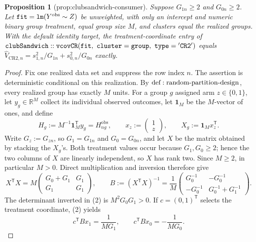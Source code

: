 \documentclass{article}
\newtheorem{proposition}{Proposition}
\begin{document}
\begin{proposition}[prop:clubsandwich-consumer]\label{prop:clubsandwich-consumer}
Suppose \(G_{1n}\ge 2\) and \(G_{0n}\ge 2\). Let \({\tt fit}={\tt lm}(Y^{\mathrm{obs}}\sim Z)\) be unweighted, with only an intercept and numeric binary group treatment, equal group size \(M\), and clusters equal the realized groups. With the default identity target, the treatment-coordinate entry of \({\tt clubSandwich::vcovCR}({\tt fit},\ {\tt cluster}={\tt group},\ {\tt type}={\tt 'CR2'})\) equals \(\widehat V_{\mathrm{CR2},n}=s_{1,n}^2/G_{1n}+s_{0,n}^2/G_{0n}\) exactly.
\end{proposition}
\begin{proof}
Fix one realized data set and suppress the row index \(n\).  The assertion is deterministic conditional on this realization.  By \({\rm def:random\text{-}partition\text{-}design}\), every realized group has exactly \(M\) units.  For a group \(g\) assigned arm \(z\in\{0,1\}\), let \(y_g\in\mathbb R^M\) collect its individual observed outcomes, let \(\mathbf 1_M\) be the \(M\)-vector of ones, and define
\[
 H_g:=M^{-1}\mathbf 1_M^{\mathsf T}y_g=H^{\mathrm{obs}}_{ng},
 \qquad
 x_z:=\begin{pmatrix}1\\ z\end{pmatrix},
 \qquad
 X_g:=\mathbf 1_Mx_z^{\mathsf T}.
 \tag{1}
\]
Write \(G_z:=G_{zn}\), so \(G_1=G_{1n}\) and \(G_0=G_{0n}\), and let \(X\) be the matrix obtained by stacking the \(X_g\)'s.  Both treatment values occur because \(G_1,G_0\ge2\); hence the two columns of \(X\) are linearly independent, so \(X\) has rank two.  Since \(M\ge2\), in particular \(M>0\).  Direct multiplication and inversion therefore give
\[
 X^{\mathsf T}X
 =M\begin{pmatrix}G_0+G_1&G_1\\G_1&G_1\end{pmatrix},
 \qquad
 B:=(X^{\mathsf T}X)^{-1}
 =\frac1M\begin{pmatrix}
 G_0^{-1}&-G_0^{-1}\\
 -G_0^{-1}&G_0^{-1}+G_1^{-1}
 \end{pmatrix}.
 \tag{2}
\]
The determinant inverted in (2) is \(M^2G_0G_1>0\).  If \(c=(0,1)^{\mathsf T}\) selects the treatment coordinate, (2) yields
\[
 c^{\mathsf T}Bx_1=\frac1{MG_1},
 \qquad
 c^{\mathsf T}Bx_0=-\frac1{MG_0}.
 \tag{3}
\]


\end{proof}
\end{document}

